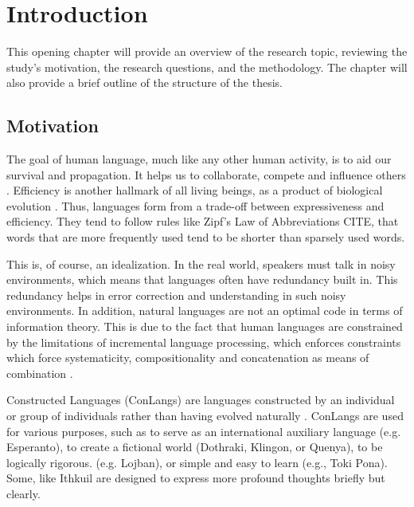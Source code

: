 
\chapter{Introduction}\label{chapter:introduction}

This opening chapter will provide an overview of the research topic, reviewing the study's motivation, the research questions, and the 
methodology. The chapter will also provide a brief outline of the structure of the thesis.

\section{Motivation}

The goal of human language, much like any other human activity, is to aid our survival and propagation. It helps us to collaborate, compete and 
influence others \cite{Levshina_2022}. Efficiency is another hallmark of all living beings, as a product of biological evolution \cite{haCostBenefit2010}. 
Thus, languages form from a trade-off between expressiveness and efficiency. They tend to follow rules like Zipf's Law of Abbreviations CITE, 
that words that are more frequently used tend to be shorter than sparsely used words. 

This is, of course, an idealization. In the real world, speakers must talk in noisy environments, which means that languages often have redundancy
built in. This redundancy helps in error correction and understanding in such noisy environments. In addition, natural languages are not an
optimal code in terms of information theory. This is due to the fact that human languages are constrained by the limitations of incremental
language processing, which enforces constraints which force systematicity, compositionality and concatenation as means of 
combination \cite{futrellInformationTheoryBridge2022}.

Constructed Languages (ConLangs) are languages constructed by an individual or group of individuals rather than having evolved 
naturally \cite{schreyerConstructedLanguages2021}. ConLangs are used for various purposes, such as to serve as an international auxiliary 
language (e.g. Esperanto), to create a fictional world (Dothraki, Klingon, or Quenya), to be logically rigorous. (e.g. Lojban), or simple 
and easy to learn (e.g., Toki Pona). Some, like Ithkuil \cite{Ithkuil2024} are designed to express more profound thoughts briefly but clearly. 

